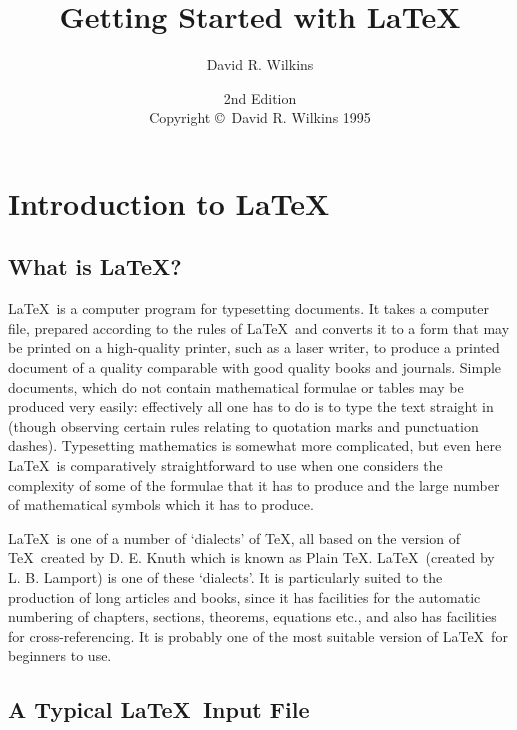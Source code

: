 \documentclass[a4paper,12pt]{article}
\begin{document}
\title{Getting Started with \LaTeX}
\author{David R. Wilkins}
\date{2nd Edition\\[3pt]
Copyright \copyright\ David R. Wilkins 1995}
\maketitle

\tableofcontents

\section{Introduction to \LaTeX}

\subsection{What is \LaTeX?}

\LaTeX\ is a computer program for typesetting documents.  It
takes a computer file, prepared according to the rules of
\LaTeX\, and converts it to a form that may be printed on a
high-quality printer, such as a laser writer, to produce
a printed document of a quality comparable with good
quality books and journals.  Simple documents, which do
not contain mathematical formulae or tables may be produced
very easily: effectively all one has to do is to type the
text straight in (though observing certain rules relating to
quotation marks and punctuation dashes).  Typesetting
mathematics is somewhat more complicated, but even here
\LaTeX\ is comparatively straightforward to use when one
considers the complexity of some of the formulae that it
has to produce and the large number of mathematical symbols
which it has to produce.

\LaTeX\ is one of a number of `dialects' of \TeX, all based on the
version of \TeX\ created by D. E. Knuth which is known as
Plain \TeX.  \LaTeX\ (created by L. B. Lamport) is one of
these `dialects'.  It is particularly suited to the
production of long articles and books, since it has
facilities for the automatic numbering of chapters, sections,
theorems, equations etc., and also has facilities for
cross-referencing.  It is probably one of the most suitable
version of \LaTeX\ for beginners to use.

\subsection{A Typical \LaTeX\ Input File}
\end{document}
